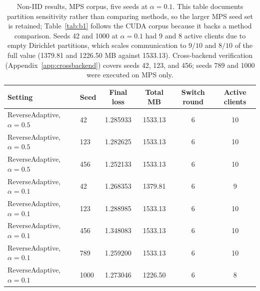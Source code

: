 \documentclass{ieeetj}
\begin{document}
\begin{table}[t]
\caption{Non-IID results, MPS corpus, five seeds at $\alpha{=}0.1$. This table documents partition sensitivity rather than comparing methods, so the larger MPS seed set is retained; Table~\ref{tab:b1} follows the CUDA corpus because it backs a method comparison. Seeds 42 and 1000 at $\alpha{=}0.1$ had 9 and 8 active clients due to empty Dirichlet partitions, which scales communication to $9/10$ and $8/10$ of the full value (1379.81 and 1226.50 MB against 1533.13). Cross-backend verification (Appendix~\ref{app:crossbackend}) covers seeds 42, 123, and 456; seeds 789 and 1000 were executed on MPS only.}
\label{tab:b2}
\begin{center}
\footnotesize
\setlength{\tabcolsep}{4pt}
\begin{tabular}{llcccc}
\toprule
Setting & Seed & Final loss & Total MB & Switch round & Active clients \\
\midrule
ReverseAdaptive, $\alpha{=}0.5$ & 42 & 1.285933 & 1533.13 & 6 & 10 \\
ReverseAdaptive, $\alpha{=}0.5$ & 123 & 1.282625 & 1533.13 & 6 & 10 \\
ReverseAdaptive, $\alpha{=}0.5$ & 456 & 1.252133 & 1533.13 & 6 & 10 \\
ReverseAdaptive, $\alpha{=}0.1$ & 42 & 1.268353 & 1379.81 & 6 & 9 \\
ReverseAdaptive, $\alpha{=}0.1$ & 123 & 1.288985 & 1533.13 & 6 & 10 \\
ReverseAdaptive, $\alpha{=}0.1$ & 456 & 1.348083 & 1533.13 & 6 & 10 \\
ReverseAdaptive, $\alpha{=}0.1$ & 789 & 1.259200 & 1533.13 & 6 & 10 \\
ReverseAdaptive, $\alpha{=}0.1$ & 1000 & 1.273046 & 1226.50 & 6 & 8 \\
\bottomrule
\end{tabular}
\end{center}
\end{table}
\end{document}
